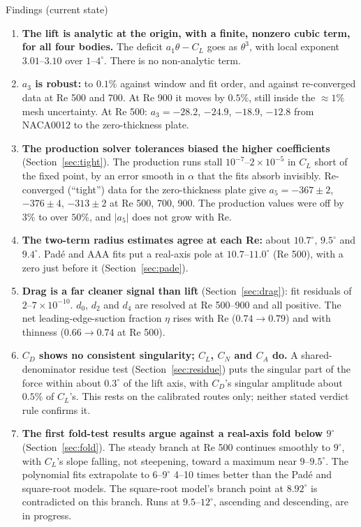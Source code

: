 \documentclass[11pt,a4paper]{article}
\newcommand{\CL}{C_L}
\newcommand{\CD}{C_D}
\newcommand{\CN}{C_N}
\newcommand{\CA}{C_A}
\begin{document}
\begin{keybox}{Findings (current state)}
\begin{enumerate}[leftmargin=*]
\item \textbf{The lift is analytic at the origin, with a finite, nonzero cubic term, for all four
  bodies.} The deficit $a_1\theta - \CL$ goes as $\theta^3$, with local exponent $3.01$--$3.10$ over
  $1$--$4^\circ$. There is no non-analytic term.
\item \textbf{$a_3$ is robust:} to $0.1\%$ against window and fit order, and against re-converged data at Re
  500 and 700. At Re 900 it moves by $0.5\%$, still inside the $\approx1\%$ mesh uncertainty. At Re 500:
  $a_3 = -28.2$, $-24.9$, $-18.9$, $-12.8$ from NACA0012 to the zero-thickness plate.
\item \textbf{The production solver tolerances biased the higher coefficients} (Section~\ref{sec:tight}).
  The production runs stall $10^{-7}$--$2\times10^{-5}$ in $\CL$ short of the fixed point, by an error smooth
  in $\alpha$ that the fits absorb invisibly. Re-converged (``tight'') data for the zero-thickness plate
  give $a_5 = -367\pm2$, $-376\pm4$, $-313\pm2$ at Re 500, 700, 900. The production values were off by
  $3\%$ to over $50\%$, and $|a_5|$ does not grow with Re.
\item \textbf{The two-term radius estimates agree at each Re:} about $10.7^\circ$, $9.5^\circ$ and $9.4^\circ$.
  Padé and AAA fits put a real-axis pole at $10.7$--$11.0^\circ$ (Re 500), with a zero just before it
  (Section~\ref{sec:pade}).
\item \textbf{Drag is a far cleaner signal than lift} (Section~\ref{sec:drag}): fit residuals of
  $2$--$7\times10^{-10}$. $d_0$, $d_2$ and $d_4$ are resolved at Re 500--900 and all positive. The net
  leading-edge-suction fraction $\eta$ rises with Re ($0.74\to0.79$) and with thinness ($0.66\to0.74$
  at Re 500).
\item \textbf{$\CD$ shows no consistent singularity; $\CL$, $\CN$ and $\CA$ do.} A shared-denominator
  residue test (Section~\ref{sec:residue}) puts the singular part of the force within about $0.3^\circ$ of
  the lift axis, with $\CD$'s singular amplitude about $0.5\%$ of $\CL$'s. This rests on the calibrated
  routes only; neither stated verdict rule confirms it.
\item \textbf{The first fold-test results argue against a real-axis fold below $9^\circ$}
  (Section~\ref{sec:fold}). The steady branch at Re 500 continues smoothly to $9^\circ$, with $\CL$'s slope
  falling, not steepening, toward a maximum near $9$--$9.5^\circ$. The polynomial fits extrapolate to
  $6$--$9^\circ$ 4--10 times better than the Padé and square-root models. The square-root model's branch
  point at $8.92^\circ$ is contradicted on this branch. Runs at $9.5$--$12^\circ$, ascending and
  descending, are in progress.
\end{enumerate}
\end{keybox}
\end{document}
